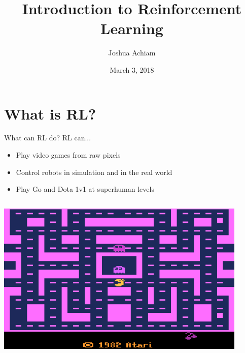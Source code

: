 \documentclass[9pt]{beamer}
\begin{document}


\title{Introduction to Reinforcement Learning}
\author{Joshua Achiam}
\date{March 3, 2018}

\begin{frame}
\titlepage
\end{frame}

\section{What is RL?}



\begin{frame}{What can RL do?}
RL can...
\begin{itemize}
\item Play video games from raw pixels
\item Control robots in simulation and in the real world
\item Play Go and Dota 1v1 at superhuman levels
\end{itemize}

\begin{columns}
\begin{column}{0.33\textwidth}
    \begin{center}
     \includegraphics[width=0.9\textwidth]{ms_pacman}


\end{center}
\end{column}
\end{columns}
\end{frame}
\end{document}
